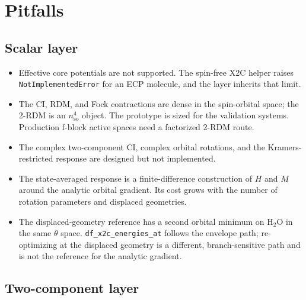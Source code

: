 \section{Pitfalls}
\label{sec:x2c-limits}

\subsection{Scalar layer}

{\sloppy
\begin{itemize}
\item Effective core potentials are not supported.  The spin-free X2C
  helper raises \texttt{NotImplementedError} for an ECP molecule, and
  the layer inherits that limit.
\item The CI, RDM, and Fock contractions are dense in the spin-orbital
  space; the 2-RDM is an $n_{\mathrm{so}}^4$ object.  The prototype is
  sized for the validation systems.  Production f-block active spaces
  need a factorized 2-RDM route.
\item The complex two-component CI, complex orbital rotations, and the
  Kramers-restricted response are designed but not implemented.
\item The state-averaged response is a finite-difference construction
  of $H$ and $M$ around the analytic orbital gradient.  Its cost grows
  with the number of rotation parameters and displaced geometries.
\item The displaced-geometry reference has a second orbital minimum on
  H$_2$O in the same $\theta$ space.  \texttt{df\_x2c\_energies\_at}
  follows the envelope path; re-optimizing at the displaced geometry is
  a different, branch-sensitive path and is not the reference for the
  analytic gradient.
\end{itemize}
\par}

\subsection{Two-component layer}

